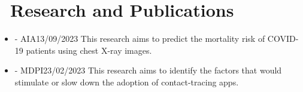 \section{\texorpdfstring{\faSearch}{}\ Research and Publications}


\begin{itemize}[parsep=0.8ex]
      \item  \textbf{} - AIA\hspace*{0pt}\hfill {13/09/2023}
            \newline This research aims to predict the mortality risk of COVID-19 patients using chest X-ray images.


      \item \textbf{} - MDPI\hspace*{0pt}\hfill {23/02/2023}
            \newline This research aims to identify the factors that would stimulate or slow down the adoption of contact-tracing apps.
\end{itemize}